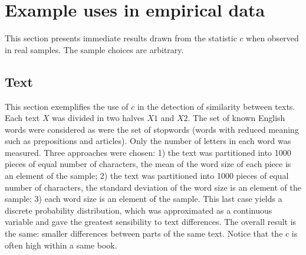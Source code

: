 \documentclass[%
	aip,
	jmp,%
	amsmath,amssymb,
	reprint,%
]{revtex4-1}
\begin{document}






%
%



\FloatBarrier
\section{Example uses in empirical data}\label{sec:empirical}

This section presents immediate results
drawn from the statistic $c$ when observed
in real samples.
The sample choices are arbitrary.

\subsection{Text}
This section exemplifies the use of $c$
in the detection of similarity between texts.
Each text $X$ was divided in two halves $X1$ and $X2$.
The set of known English words were considered as were 
the set of stopwords (words with reduced meaning such
as prepositions and articles).
Only the number of letters in each word was measured.
Three approaches were chosen: 1) the text was partitioned into 1000 pieces of equal number of characters, the mean of the word size of each piece is an element of the sample; 2) the text was partitioned into 1000 pieces of equal number of characters, the standard deviation of the word size is an element of the sample; 3) each word size is an element of the sample.
This last case yields a discrete probability distribution, which was approximated as a continuous variable and gave the greatest sensibility to text differences.
The overall result is the same: smaller differences between parts
of the same text.
Notice that the $c$ is often high within a same book.








\end{document}
